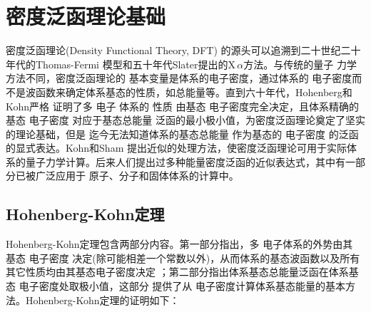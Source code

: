 \setcounter{chapter}{3}
\chapter{密度泛函{理论}基础} \label{chap:dft}%
密度泛函理论(Density Functional Theory, DFT)\cite{Parr-Yang,CR91-651_1991}%
{的源头}可以追溯到二十世纪二十年代的Thomas-Fermi%
{模型}\cite{PCPS23-542_1927,ZP48-73_1928}和五十年代Slater提出的X\,$\alpha$方法\cite{PR81-385_1951}。与传统的量子%
{力}学方法不同，密度泛函理论的%
{基本变量是体系的电子}密度，通过体系的%
{电}子密度而不是波函数来确定体系基态的性质，如总能量等。直到六十年代，Hohenberg和Kohn\cite{PR136-B864_1964}严格%
证明了多%
{电}子%
体系的%
性质%
由基态%
{电}子密度完全决定，且体系精确的基态%
{电}子密度%
{对应于}基态总能量%
{泛函的最小极小值}，为密度泛函理论奠定了坚实的理论基础，但是%
{迄今无法知道}体系的基态总能量%
{作为}基态的%
{电}子密度%
{的泛函的显式表达}。Kohn和\linebreak Sham\cite{PR140-A1133_1965}%
{提出近似的处理方法，使密度泛函理论可用于实际体系的量子力学计算。后来人们提出过多种能量密度泛函的近似表达式，其中有一部分已被}广泛应用于%
原子、分子和固体体系{的计算中\cite{CJP58-1200_1980,PRB45-13244_1992,PRA38-3098_1988,PRB33-8822_1986,PRB37-785_1988}}。

\section{Hohenberg-Kohn定理}
Hohenberg-Kohn定理\cite{PRB136-864_1964}包含两部分{内容}。第一部分指出，多%
{电}子体系的外势由其%
基态%
{电}子密度%
决定(除可能相差一个常数以外)，从而体系的基态波函数以及所有其它性质均由其基态电子密度决定
；第二部分指出体系基态总能量{泛函}在体系基态%
{电}子密度处取极小{值}，这部分%
{提供}了从%
{电}子密度计算体系基态能量的基本方法。Hohenberg-Kohn定理的证明如下：

